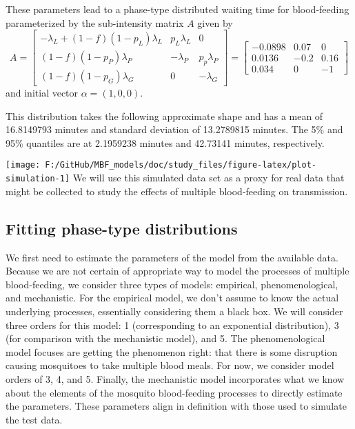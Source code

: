 \documentclass[
]{article}
\begin{document}
These parameters lead to a phase-type distributed waiting time for
blood-feeding parameterized by the sub-intensity matrix \(A\) given by
\[
A = \begin{bmatrix}-\lambda_{L}+\left(1-f\right)\left(1-p_{L}\right)\lambda_{L} & p_{L}\lambda_{L} & 0\\
\left(1-f\right)\left(1-p_{P}\right)\lambda_{P} & -\lambda_{P} & p_{p}\lambda_{P}\\
\left(1-f\right)\left(1-p_{G}\right)\lambda_{G} & 0 & -\lambda_{G}
\end{bmatrix}  = \begin{bmatrix} -0.0898 & 0.07 & 0\\
0.0136 & -0.2 & 0.16\\
0.034 & 0 & -1
\end{bmatrix}
\] and initial vector \(\alpha = \left(1,0,0\right)\).

This distribution takes the following approximate shape and has a mean
of 16.8149793 minutes and standard deviation of 13.2789815 minutes. The
5\% and 95\% quantiles are at 2.1959238 minutes and 42.73141 minutes,
respectively.

\texttt{[image: F:/GitHub/MBF\_models/doc/study\_files/figure-latex/plot-simulation-1]}
We will use this simulated data set as a proxy for real data that might
be collected to study the effects of multiple blood-feeding on
transmission.

\subsection{Fitting phase-type
distributions}\label{fitting-phase-type-distributions}

We first need to estimate the parameters of the model from the available
data. Because we are not certain of appropriate way to model the
processes of multiple blood-feeding, we consider three types of models:
empirical, phenomenological, and mechanistic. For the empirical model,
we don't assume to know the actual underlying processes, essentially
considering them a black box. We will consider three orders for this
model: 1 (corresponding to an exponential distribution), 3 (for
comparison with the mechanistic model), and 5. The phenomenological
model focuses are getting the phenomenon right: that there is some
disruption causing mosquitoes to take multiple blood meals. For now, we
consider model orders of 3, 4, and 5. Finally, the mechanistic model
incorporates what we know about the elements of the mosquito
blood-feeding processes to directly estimate the parameters. These
parameters align in definition with those used to simulate the test
data.
\end{document}
